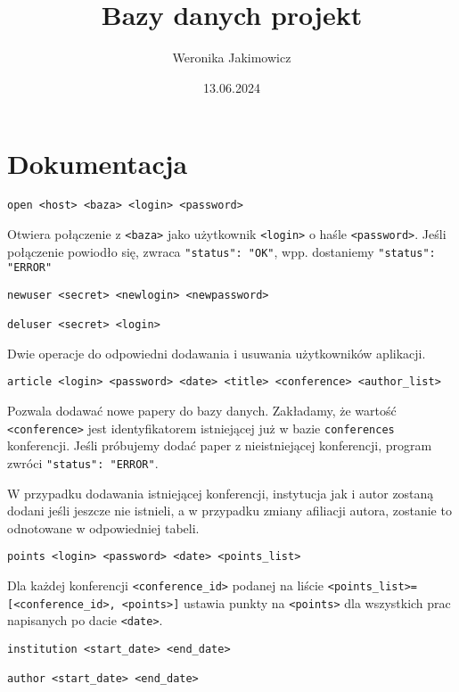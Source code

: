 \documentclass[12pt]{article}
\title{Bazy danych projekt}
\author{Weronika Jakimowicz}
\date{13.06.2024}
\def\inline{\lstinline[basicstyle=\ttfamily\large\color{orange!50!fg}]}
\begin{document}
\maketitle 

\section{Dokumentacja}

\begin{lstlisting}
open <host> <baza> <login> <password>
\end{lstlisting}

Otwiera połączenie z \inline{<baza>} jako użytkownik \inline{<login>} o haśle \inline{<password>}. Jeśli połączenie powiodło się, zwraca \inline{"status": "OK"}, wpp. dostaniemy \inline{"status": "ERROR"}

\begin{lstlisting}
newuser <secret> <newlogin> <newpassword>

deluser <secret> <login>
\end{lstlisting}

Dwie operacje do odpowiedni dodawania i usuwania użytkowników aplikacji.

\begin{lstlisting}
article <login> <password> <date> <title> <conference> <author_list> 
\end{lstlisting}

Pozwala dodawać nowe papery do bazy danych. Zakładamy, że wartość \inline{<conference>} jest identyfikatorem istniejącej już w bazie \inline{conferences} konferencji. Jeśli próbujemy dodać paper z nieistniejącej konferencji, program zwróci \inline{"status": "ERROR"}.

W przypadku dodawania istniejącej konferencji, instytucja jak i autor zostaną dodani jeśli jeszcze nie istnieli, a w przypadku zmiany afiliacji autora, zostanie to odnotowane w odpowiedniej tabeli.

\begin{lstlisting}
points <login> <password> <date> <points_list>
\end{lstlisting}

Dla każdej konferencji \inline{<conference_id>} podanej na liście \inline{<points_list>=[<conference_id>, <points>]} ustawia punkty na \inline{<points>} dla wszystkich prac napisanych po dacie \inline{<date>}.

\begin{lstlisting}
institution <start_date> <end_date>

author <start_date> <end_date>
\end{lstlisting}
\end{document}
